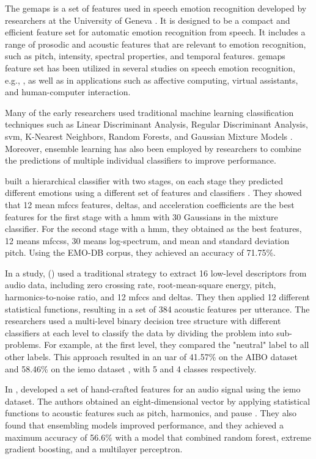 The \ac{gemaps} is a set of features used in speech emotion recognition developed by researchers at the University of Geneva \cite{Eyben2016}. It is designed to be a compact and efficient feature set for automatic emotion recognition from speech. It includes a range of prosodic and acoustic features that are relevant to emotion recognition, such as pitch, intensity, spectral properties, and temporal features. \ac{gemaps} feature set has been utilized in several studies on speech emotion recognition, e.g., \cite{Tarantino2019}, as well as in applications such as affective computing, virtual assistants, and human-computer interaction.

Many of the early researchers used traditional machine learning classification techniques such as Linear Discriminant Analysis, Regular Discriminant Analysis, \ac{svm}, K-Nearest Neighbors, Random Forests, and Gaussian Mixture Models \cite{Kuchibhotla2014}. Moreover, ensemble learning has also been employed by researchers to combine the predictions of multiple individual classifiers to improve performance.

\citeauthor{Albornoz2011} built a hierarchical classifier with two stages, on each stage they predicted different emotions using a different set of features and classifiers \cite{Albornoz2011}. They showed that 12 mean \ac{mfccs} features, deltas, and acceleration coefficients are the best features for the first stage with a \ac{hmm} with 30 Gaussians in the mixture classifier. For the second stage with a \ac{hmm}, they obtained as the best features, 12 means \acp{mfccs}, 30 means log-spectrum, and mean and standard deviation pitch. Using the EMO-DB corpus, they achieved an accuracy of 71.75\%.

In a study, \citeauthor{Lee2011} (\citeyear{Lee2011}) used a traditional strategy to extract 16 low-level descriptors from audio data, including zero crossing rate, root-mean-square energy, pitch, harmonics-to-noise ratio, and 12 \ac{mfccs} and deltas. They then applied 12 different statistical functions, resulting in a set of 384 acoustic features per utterance. The researchers used a multi-level binary decision tree structure with different classifiers at each level to classify the data by dividing the problem into sub-problems. For example, at the first level, they compared the "neutral" label to all other labels. This approach resulted in an \ac{uar} of 41.57\% on the AIBO dataset and 58.46\% on the \ac{iemo} dataset \cite{Lee2011}, with 5 and 4 classes respectively.

In \citeyear{HandCraftedSahu}, \citeauthor{HandCraftedSahu} developed a set of hand-crafted features for an audio signal using the \ac{iemo} dataset. The authors obtained an eight-dimensional vector by applying statistical functions 
 to acoustic features such as pitch, harmonics, and pause \cite{HandCraftedSahu}. They also found that ensembling models improved performance, and they achieved a maximum accuracy of 56.6\% with a model that combined random forest, extreme gradient boosting, and a multilayer perceptron.


